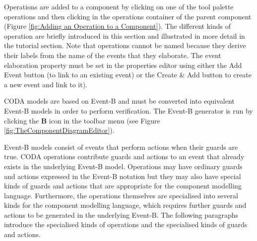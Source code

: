 Operations are added to a component by clicking on one of the tool palette operations and then clicking in the operations container of the parent component (Figure \ref{fig:Adding an Operation to a Component}). The different kinds of operation are briefly introduced in this section and illustrated in more detail in the tutorial section. Note that operations cannot be named because they derive their labels from the name of the events that they elaborate. The event elaboration property must be set in the properties editor using either the Add Event button (to link to an existing event) or the Create \& Add button to create a new event and link to it).


CODA models are based on Event-B and must be converted into equivalent Event-B models in order to perform verification. The Event-B generator is run by clicking the \textbf{B} icon in the toolbar menu (see Figure \ref{fig:TheComponentDiagramEditor}).


Event-B models consist of events that perform actions when their guards are true. CODA operations contribute guards and actions to an event that already exists in the underlying Event-B model. Operations may have ordinary guards and actions expressed in the Event-B notation but they may also have special kinds of guards and actions that are appropriate for the component modelling language. Furthermore, the operations themselves are specialised into several kinds for the component modelling language, which requires further guards and actions to be generated in the underlying Event-B. The following paragraphs introduce the specialised kinds of operations and the specialised kinds of guards and actions.
 
